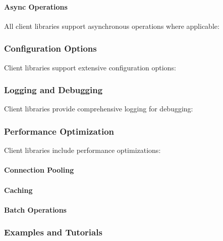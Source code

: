 \documentclass[letterpaper,10pt,english]{sphinxmanual}
\begin{document}
\paragraph{Async Operations}
\label{\detokenize{api/client-libraries:async-operations}}
\sphinxAtStartPar
All client libraries support asynchronous operations where applicable:


\subsubsection{Configuration Options}
\label{\detokenize{api/client-libraries:configuration-options}}
\sphinxAtStartPar
Client libraries support extensive configuration options:


\subsubsection{Logging and Debugging}
\label{\detokenize{api/client-libraries:logging-and-debugging}}
\sphinxAtStartPar
Client libraries provide comprehensive logging for debugging:


\subsubsection{Performance Optimization}
\label{\detokenize{api/client-libraries:performance-optimization}}
\sphinxAtStartPar
Client libraries include performance optimizations:


\paragraph{Connection Pooling}
\label{\detokenize{api/client-libraries:connection-pooling}}

\paragraph{Caching}
\label{\detokenize{api/client-libraries:caching}}

\paragraph{Batch Operations}
\label{\detokenize{api/client-libraries:batch-operations}}

\subsubsection{Examples and Tutorials}
\label{\detokenize{api/client-libraries:examples-and-tutorials}}
\end{document}
